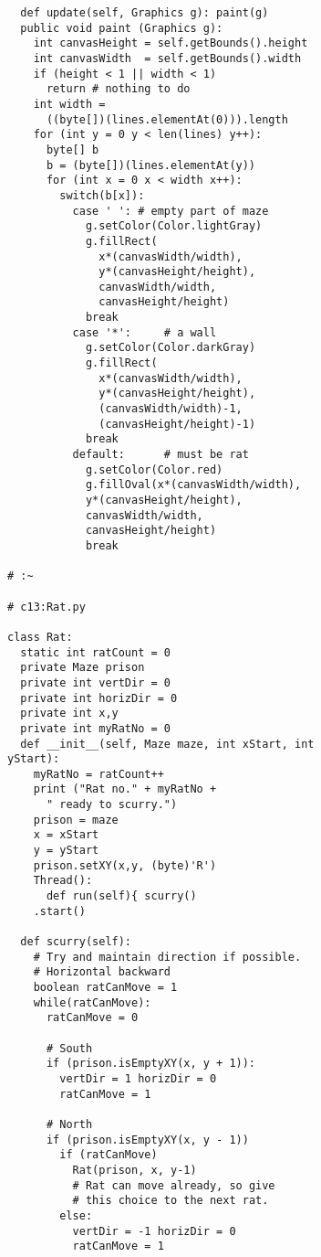 \begin{lstlisting}
  def update(self, Graphics g): paint(g)  
  public void paint (Graphics g): 
    int canvasHeight = self.getBounds().height 
    int canvasWidth  = self.getBounds().width 
    if (height < 1 || width < 1)  
      return # nothing to do  
    int width =  
      ((byte[])(lines.elementAt(0))).length 
    for (int y = 0 y < len(lines) y++): 
      byte[] b 
      b = (byte[])(lines.elementAt(y)) 
      for (int x = 0 x < width x++): 
        switch(b[x]): 
          case ' ': # empty part of maze 
            g.setColor(Color.lightGray) 
            g.fillRect( 
              x*(canvasWidth/width), 
              y*(canvasHeight/height), 
              canvasWidth/width, 
              canvasHeight/height) 
            break 
          case '*':     # a wall  
            g.setColor(Color.darkGray) 
            g.fillRect( 
              x*(canvasWidth/width), 
              y*(canvasHeight/height), 
              (canvasWidth/width)-1, 
              (canvasHeight/height)-1) 
            break 
          default:      # must be rat 
            g.setColor(Color.red) 
            g.fillOval(x*(canvasWidth/width), 
            y*(canvasHeight/height), 
            canvasWidth/width, 
            canvasHeight/height) 
            break              
            
# :~ 

# c13:Rat.py 

class Rat: 
  static int ratCount = 0 
  private Maze prison 
  private int vertDir = 0  
  private int horizDir = 0 
  private int x,y 
  private int myRatNo = 0 
  def __init__(self, Maze maze, int xStart, int 
yStart): 
    myRatNo = ratCount++ 
    print ("Rat no." + myRatNo +  
      " ready to scurry.") 
    prison = maze 
    x = xStart 
    y = yStart 
    prison.setXY(x,y, (byte)'R') 
    Thread(): 
      def run(self){ scurry()  
    .start() 
    
  def scurry(self): 
    # Try and maintain direction if possible. 
    # Horizontal backward 
    boolean ratCanMove = 1 
    while(ratCanMove): 
      ratCanMove = 0 
      
      # South  
      if (prison.isEmptyXY(x, y + 1)): 
        vertDir = 1 horizDir = 0          
        ratCanMove = 1
        
      # North 
      if (prison.isEmptyXY(x, y - 1)) 
        if (ratCanMove) 
          Rat(prison, x, y-1) 
          # Rat can move already, so give  
          # this choice to the next rat. 
        else: 
          vertDir = -1 horizDir = 0          
          ratCanMove = 1 
          

\end{lstlisting}
